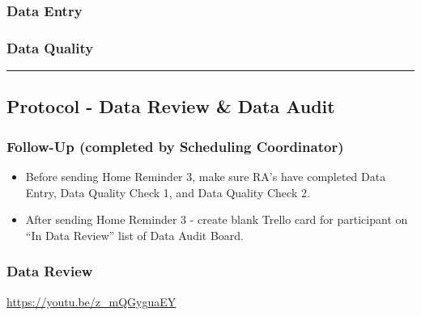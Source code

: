 \documentclass[]{book}
\providecommand{\tightlist}{%
  \setlength{\itemsep}{0pt}\setlength{\parskip}{0pt}}
\begin{document}
\hypertarget{data-entry}{%
\subsubsection{Data Entry}\label{data-entry}}

\hypertarget{data-quality}{%
\subsubsection{Data Quality}\label{data-quality}}

\begin{center}\rule{0.5\linewidth}{0.5pt}\end{center}

\hypertarget{protocol---data-review-data-audit}{%
\subsection{Protocol - Data Review \& Data Audit}\label{protocol---data-review-data-audit}}

\hypertarget{follow-up-completed-by-scheduling-coordinator}{%
\subsubsection{Follow-Up (completed by Scheduling Coordinator)}\label{follow-up-completed-by-scheduling-coordinator}}

\begin{itemize}
\tightlist
\item
  Before sending Home Reminder 3, make sure RA's have completed Data Entry, Data Quality Check 1, and Data Quality Check 2.
\item
  After sending Home Reminder 3 - create blank Trello card for participant on ``In Data Review'' list of Data Audit Board.
\end{itemize}

\hypertarget{data-review}{%
\subsubsection{Data Review}\label{data-review}}

\url{https://youtu.be/z_mQGyguaEY}
\end{document}
